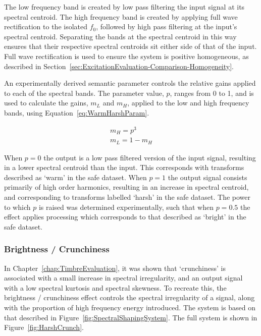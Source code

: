 			The low frequency band is created by low pass filtering the input signal at its spectral centroid.
			The high frequency band is created by applying full wave rectification to the isolated $f_{0}$,
			followed by high pass filtering at the input's spectral centroid.  Separating the bands at the
			spectral centroid in this way ensures that their respective spectral centroids sit either side of
			that of the input. Full wave rectification is used to ensure the system is positive homogeneous, as
			described in Section~\ref{sec:ExcitationEvaluation-Comparison-Homogeneity}.

			An experimentally derived semantic parameter controls the relative gains applied to each of the
			spectral bands. The parameter value, $p$, ranges from 0 to 1, and is used to calculate the gains,
			$m_{L}$ and $m_{H}$, applied to the low and high frequency bands, using
			Equation~\ref{eq:WarmHarshParam}.

			\begin{gather}
				m_{H} = p^{3} \nonumber \\[0.6em]
				m_{L} = 1 - m_{H}
				\label{eq:WarmHarshParam}
			\end{gather}

			When $p = 0$  the output is a low pass filtered version of the input signal, resulting in a lower
			spectral centroid than the input. This corresponds with transforms described as `warm' in the
			\acrshort{safe} dataset. When $p = 1$ the output signal consists primarily of high order harmonics,
			resulting in an increase in spectral centroid, and corresponding to transforms labelled `harsh' in
			the \acrshort{safe} dataset.  The power to which $p$ is raised was determined experimentally, such
			that when $p = 0.5$ the effect applies processing which corresponds to that described as `bright'
			in the \acrshort{safe} dataset. 

		\subsubsection*{Brightness / Crunchiness}
			In Chapter~\ref{chap:TimbreEvaluation}, it was shown that `crunchiness' is associated with a small
			increase in spectral irregularity, and an output signal with a low spectral kurtosis and spectral
			skewness. To recreate this, the brightness / crunchiness effect controls the spectral irregularity
			of a signal, along with the proportion of high frequency energy introduced. The system is based on
			that described in Figure~\ref{fig:SpectralShapingSystem}. The full system is shown in
			Figure~\ref{fig:HarshCrunch}.


